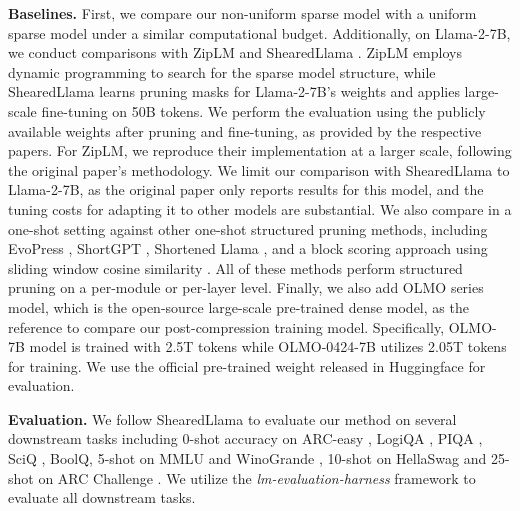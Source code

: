 \noindent \textbf{Baselines.} First, we compare our non-uniform sparse model with a uniform sparse model under a similar computational budget. Additionally, on Llama-2-7B, we conduct comparisons with ZipLM \citep{kurtic2024ziplm} and ShearedLlama \citep{xia2023sheared}. ZipLM employs dynamic programming to search for the sparse model structure, while ShearedLlama learns pruning masks for Llama-2-7B's weights and applies large-scale fine-tuning on 50B tokens. We perform the evaluation using the publicly available weights after pruning and fine-tuning, as provided by the respective papers. For ZipLM, we reproduce their implementation at a larger scale, following the original paper's methodology. We limit our comparison with ShearedLlama to Llama-2-7B, as the original paper only reports results for this model, and the tuning costs for adapting it to other models are substantial. We also compare \sysname in a one-shot setting against other one-shot structured pruning methods, including EvoPress \citep{sieberling2024evopress}, ShortGPT \citep{men2024shortgpt}, Shortened Llama \citep{kim2024shortened}, and a block scoring approach using sliding window cosine similarity \cite{gromov2024unreasonable}. All of these methods perform structured pruning on a per-module or per-layer level. Finally, we also add OLMO \cite{groeneveld2024olmo} series model, which is the open-source large-scale pre-trained dense model, as the reference to compare our post-compression training model. 
Specifically, OLMO-7B model is trained with 2.5T tokens while OLMO-0424-7B utilizes 2.05T tokens for training. We use the official pre-trained weight released in Huggingface for evaluation.



\noindent \textbf{Evaluation.} We follow ShearedLlama \citep{xia2023sheared} to evaluate our method on several downstream tasks including 0-shot accuracy on ARC-easy \citep{clark2018think}, LogiQA \citep{liu2020logiqa}, PIQA \citep{bisk2020piqa}, SciQ \citep{welbl2017crowdsourcing}, BoolQ\citep{clark2019boolq}, 5-shot on MMLU \citep{hendrycks2020measuring} and WinoGrande \citep{sakaguchi2021winogrande}, 10-shot on HellaSwag \citep{zellers2019hellaswag} and 25-shot on ARC Challenge \citep{clark2018think}. We utilize the \textit{lm-evaluation-harness} framework \citep{gao10256836framework} to evaluate all downstream tasks.

